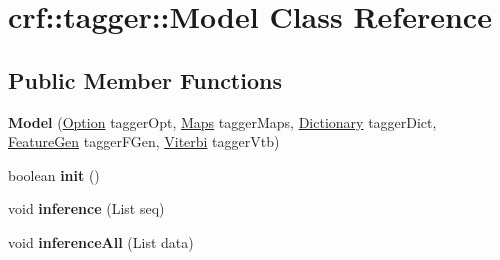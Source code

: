 \hypertarget{classcrf_1_1tagger_1_1Model}{
\section{crf::tagger::Model Class Reference}
\label{classcrf_1_1tagger_1_1Model}
}
\subsection*{Public Member Functions}
\begin{DoxyCompactItemize}
\item 
\hypertarget{classcrf_1_1tagger_1_1Model_a286cb79b69e017f1ff6d9cb911fd7544}{
{\bfseries Model} (\hyperlink{classcrf_1_1tagger_1_1Option}{Option} taggerOpt, \hyperlink{classcrf_1_1tagger_1_1Maps}{Maps} taggerMaps, \hyperlink{classcrf_1_1tagger_1_1Dictionary}{Dictionary} taggerDict, \hyperlink{classcrf_1_1tagger_1_1FeatureGen}{FeatureGen} taggerFGen, \hyperlink{classcrf_1_1tagger_1_1Viterbi}{Viterbi} taggerVtb)}
\label{classcrf_1_1tagger_1_1Model_a286cb79b69e017f1ff6d9cb911fd7544}

\item 
\hypertarget{classcrf_1_1tagger_1_1Model_ad78e05479d7b913c0b03d45b12707ee7}{
boolean {\bfseries init} ()}
\label{classcrf_1_1tagger_1_1Model_ad78e05479d7b913c0b03d45b12707ee7}

\item 
\hypertarget{classcrf_1_1tagger_1_1Model_a6ab9974798073cb6e6878d67ee821bea}{
void {\bfseries inference} (List seq)}
\label{classcrf_1_1tagger_1_1Model_a6ab9974798073cb6e6878d67ee821bea}

\item 
\hypertarget{classcrf_1_1tagger_1_1Model_a7e3603f3d479f2536b9c8c894323c9d1}{
void {\bfseries inferenceAll} (List data)}
\label{classcrf_1_1tagger_1_1Model_a7e3603f3d479f2536b9c8c894323c9d1}

\end{DoxyCompactItemize}
